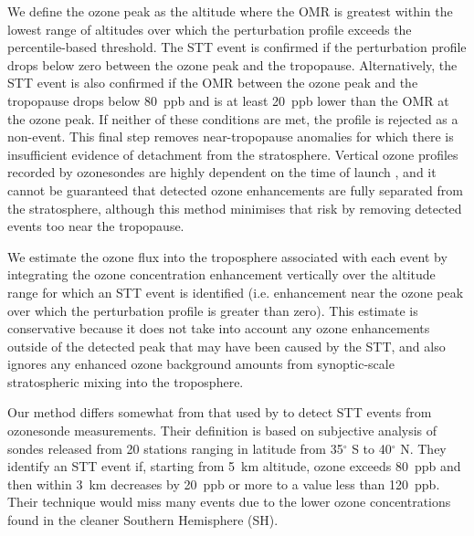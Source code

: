 \documentclass[acp, manuscript]{copernicus} %
\begin{document}
    We define the ozone peak as the altitude where the OMR is greatest within the lowest range of altitudes over which the perturbation profile exceeds the percentile-based threshold.
    The STT event is confirmed if the perturbation profile drops below zero between the ozone peak and the tropopause. 
    Alternatively, the STT event is also confirmed if the OMR between the ozone peak and the tropopause drops below 80~ppb and is at least 20~ppb lower than the OMR at the ozone peak. 
    If neither of these conditions are met, the profile is rejected as a non-event.
    This final step removes near-tropopause anomalies for which there is insufficient evidence of detachment from the stratosphere.
    Vertical ozone profiles recorded by ozonesondes are highly dependent on the time of launch \citep{Sprenger2003}, and it cannot be guaranteed that detected ozone enhancements are fully separated from the stratosphere, although this method minimises that risk by removing detected events too near the tropopause.

    We estimate the ozone flux into the troposphere associated with each event by integrating the ozone concentration enhancement vertically over the altitude range for which an STT event is identified (i.e. enhancement near the ozone peak over which the perturbation profile is greater than zero).
    This estimate is conservative because it does not take into account any ozone enhancements outside of the detected peak that may have been caused by the STT, and also ignores any enhanced ozone background amounts from synoptic-scale stratospheric mixing into the troposphere.
    
    Our method differs somewhat from that used by \citet{Tang2010} to detect STT events from ozonesonde measurements. 
    Their definition is based on subjective analysis of sondes released from 20 stations ranging in latitude from 35$^\circ$ S to 40$^\circ$ N.
    They identify an STT event if, starting from 5~km altitude, ozone exceeds 80~ppb and then within 3~km decreases by 20~ppb or more to a value less than 120~ppb.
    Their technique would miss many events due to the lower ozone concentrations found in the cleaner Southern Hemisphere (SH).
\end{document}
